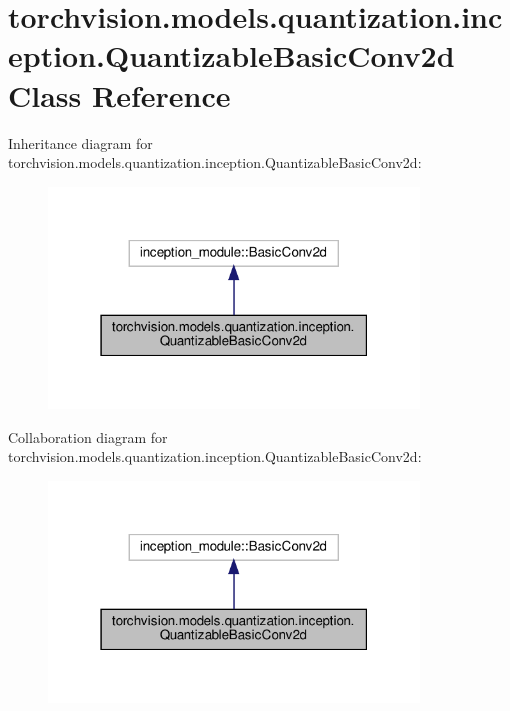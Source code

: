 \hypertarget{classtorchvision_1_1models_1_1quantization_1_1inception_1_1QuantizableBasicConv2d}{}\section{torchvision.\+models.\+quantization.\+inception.\+Quantizable\+Basic\+Conv2d Class Reference}
\label{classtorchvision_1_1models_1_1quantization_1_1inception_1_1QuantizableBasicConv2d}


Inheritance diagram for torchvision.\+models.\+quantization.\+inception.\+Quantizable\+Basic\+Conv2d\+:
\nopagebreak
\begin{figure}[H]
\begin{center}
\leavevmode
\includegraphics[width=279pt]{classtorchvision_1_1models_1_1quantization_1_1inception_1_1QuantizableBasicConv2d__inherit__graph}
\end{center}
\end{figure}


Collaboration diagram for torchvision.\+models.\+quantization.\+inception.\+Quantizable\+Basic\+Conv2d\+:
\nopagebreak
\begin{figure}[H]
\begin{center}
\leavevmode
\includegraphics[width=279pt]{classtorchvision_1_1models_1_1quantization_1_1inception_1_1QuantizableBasicConv2d__coll__graph}
\end{center}
\end{figure}
